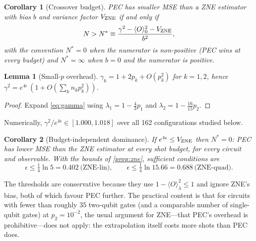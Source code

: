 \documentclass[11pt,a4paper]{article}
\newtheorem{corollary}{Corollary}
\newtheorem{lemma}{Lemma}
\theoremstyle{remark}
\newcommand{\eps}{\epsilon}
\begin{document}
\begin{corollary}[Crossover budget]
\label{cor:nstar}
PEC has smaller MSE than a ZNE estimator with bias $b$ and variance factor $V_{\rm ZNE}$ if and only if
\begin{equation}
N > N^* \equiv \frac{\gamma^2-\langle O\rangle_0^2-V_{\rm ZNE}}{b^2},
\label{eq:nstar}
\end{equation}
with the convention $N^*=0$ when the numerator is non-positive (PEC wins at every budget) and $N^*=\infty$ when $b=0$ and the numerator is positive.
\end{corollary}

\begin{lemma}[Small-$p$ overhead]
\label{lem:gamma}
$\gamma_k = 1+2p_k+O(p_k^2)$ for $k=1,2$, hence $\gamma^2 = e^{4\eps}\,(1+O(\sum_k n_kp_k^2))$.
\end{lemma}
\begin{proof}
Expand \cref{eq:gamma} using $\lambda_1=1-\tfrac43p_1$ and $\lambda_2=1-\tfrac{16}{15}p_2$.
\end{proof}
Numerically, $\gamma^2/e^{4\eps}\in[1.000,1.018]$ over all 162 configurations studied below.

\begin{corollary}[Budget-independent dominance]
\label{cor:threshold}
If $e^{4\eps}\le V_{\rm ZNE}$ then $N^*=0$: PEC has lower MSE than the ZNE estimator at every shot budget, for every circuit and observable. With the bounds of \cref{prop:zne}, sufficient conditions are
\begin{equation}
\eps\le \tfrac14\ln 5 = 0.402\ \text{(ZNE-lin)},\qquad
\eps\le \tfrac14\ln 15.66 = 0.688\ \text{(ZNE-quad)}.
\end{equation}
\end{corollary}
The thresholds are conservative because they use $1-\langle O\rangle_\lambda^2\le1$ and ignore ZNE's bias, both of which favour PEC further. The practical content is that for circuits with fewer than roughly $35$ two-qubit gates (and a comparable number of single-qubit gates) at $p_2=10^{-2}$, the usual argument for ZNE---that PEC's overhead is prohibitive---does not apply: the extrapolation itself costs more shots than PEC does.
\end{document}
